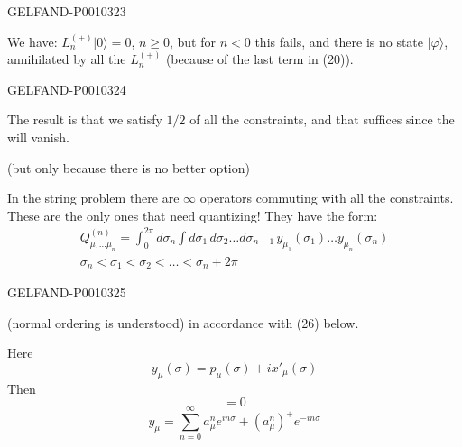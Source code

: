 \begin{GelfandAdjacentEvidence}{GELFAND-P001032}{3}


We have: $L_n^{(+)}|0\rangle=0$, $n\geq0$, but for $n<0$
this fails, and there is no state $|\varphi\rangle$, annihilated by all the $L_n^{(+)}$
(because of the last term in (20)).

\end{GelfandAdjacentEvidence}
\begin{GelfandAdjacentEvidence}{GELFAND-P001032}{4}

The result is that we satisfy $1/2$ of all the constraints, and that suffices since the  will vanish.

(but only because there is no better option)

In the string problem there are $\infty$ operators commuting with all the constraints. These are the only ones that need quantizing! They have the form:
\begin{equation*}
\begin{gathered}
Q_{\mu_1\ldots\mu_n}^{(n)}=
\int_0^{2\pi}d\sigma_n\int d\sigma_1\,d\sigma_2\ldots d\sigma_{n-1}
\,y_{\mu_1}(\sigma_1)\ldots y_{\mu_n}(\sigma_n)\\
\sigma_n<\sigma_1<\sigma_2<\ldots<\sigma_n+2\pi
\end{gathered}
\tag{24}
\end{equation*}
\end{GelfandAdjacentEvidence}
\begin{GelfandAdjacentEvidence}{GELFAND-P001032}{5}

\end{GelfandAdjacentEvidence}


(normal ordering is understood) in accordance with (26) below.

Here
\[
y_\mu(\sigma)=p_\mu(\sigma)+i x'_\mu(\sigma)
\]
Then
\begin{equation*}
[Q,L_n]=0
\tag{25}
\end{equation*}
\begin{equation*}
y_\mu=\sum_{n=0}^{\infty}a_\mu^n e^{in\sigma}
+(a_\mu^n)^+e^{-in\sigma}
\tag{26}
\end{equation*}


